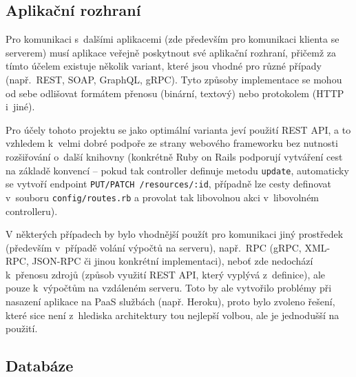 \documentclass[twoside]{ctuthesis}
\begin{document}



\subsection{Aplikační rozhraní}

Pro komunikaci s~dalšími aplikacemi (zde především pro komunikaci klienta se serverem) musí aplikace veřejně poskytnout své aplikační rozhraní, přičemž za tímto účelem existuje několik variant, které jsou vhodné pro různé případy (např.~REST, SOAP, GraphQL, gRPC). Tyto způsoby implementace se mohou od sebe odlišovat formátem přenosu (binární, textový) nebo protokolem (HTTP i~jiné).

Pro účely tohoto projektu se jako optimální varianta jeví použití REST API, a to vzhledem k~velmi dobré podpoře ze strany webového frameworku bez nutnosti rozšiřování o~další knihovny (konkrétně Ruby on Rails podporují vytváření cest na základě konvencí – pokud tak controller definuje metodu \texttt{update}, automaticky se vytvoří endpoint \texttt{PUT/PATCH /resources/:id}, případně lze cesty definovat v~souboru \texttt{config/routes.rb} a provolat tak libovolnou akci v~libovolném controlleru).

V některých případech by bylo vhodnější použít pro komunikaci jiný prostředek (především v~případě volání výpočtů na serveru), např.~RPC (gRPC, XML-RPC, JSON-RPC či jinou konkrétní implementaci), neboť zde nedochází k~přenosu zdrojů (způsob využití REST API, který vyplývá z~definice), ale pouze k~výpočtům na vzdáleném serveru. Toto by ale vytvořilo problémy při nasazení aplikace na PaaS službách (např. Heroku), proto bylo zvoleno řešení, které sice není z~hlediska architektury tou nejlepší volbou, ale je jednodušší na použití.

\subsection{Databáze}
\end{document}
